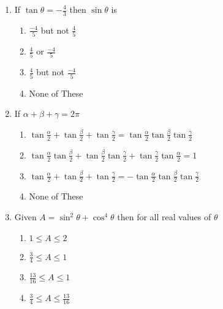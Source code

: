 \documentclass[journal,12pt,twocolumn]{IEEEtran}
\theoremstyle{remark}
\begin{document}
\begin{enumerate}



	\item If $\tan\theta =-\frac{4}{3}$ then $\sin \theta$ is 
		
		\hfill{}
		
  
		\begin{enumerate}[label=(\alph*)]
				\item $\frac{-4}{5}$ but not $\frac{4}{5}$ 
				\item $\frac{4}{5}$ or $\frac{-4}{5}$ 
				\item $\frac{4}{5}$ but not $\frac{-4}{5}$ 
				\item None of These 
		\end{enumerate}
  

  
	\item If $\alpha+ \beta +\gamma = 2\pi$ 
		\hfill{}
  
		\begin{enumerate}[label=(\alph*)]
  
  
			\item $\tan\frac{\alpha}{2} + \tan\frac{\beta}{2} + \tan\frac{\gamma}{2} = \tan\frac{\alpha}{2}\tan\frac{\beta}{2}\tan\frac{\gamma}{2}$
  
  
			\item $\tan\frac{\alpha}{2}\tan\frac{\beta}{2} + \tan\frac{\beta}{2}\tan\frac{\gamma}{2}+ \tan\frac{\gamma}{2}\tan\frac{\alpha}{2} = 1$
  
			\item $\tan\frac{\alpha}{2} + \tan\frac{\beta}{2} + \tan\frac{\gamma}{2} = -\tan\frac{\alpha}{2}\tan\frac{\beta}{2}\tan\frac{\gamma}{2}$
  
			\item None of These
  
 
		\end{enumerate}
  
  

	\item Given $A = \sin^{2}\theta + \cos^{4}\theta $ then for all real values of $\theta$ 
		\hfill{}
  
		\begin{enumerate}[label=(\alph*)]
				\item $1 \le A \le2$
  				\item $\frac{3}{4} \le A\le 1$ 
				\item $\frac{13}{16} \le A\le 1$
				\item $\frac{3}{4} \le A\le \frac{13}{16}$ 
		\end{enumerate}
  



\end{enumerate}
\end{document}
